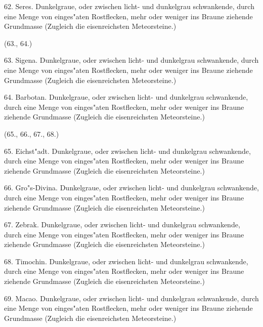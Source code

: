 \documentclass[a4paper, 11pt, oneside, polutonikogreek, german]{article}
\begin{document}
62. Seres. Dunkelgraue, oder zwischen licht- und dunkelgrau schwankende, durch eine Menge von einges"aten Rostflecken, mehr oder weniger ins Braune ziehende Grundmasse (Zugleich die eisenreichsten Meteorsteine.)

\begin{center}
(63., 64.)
\end{center}

63. Sigena. Dunkelgraue, oder zwischen licht- und dunkelgrau schwankende, durch eine Menge von einges"aten Rostflecken, mehr oder weniger ins Braune ziehende Grundmasse (Zugleich die eisenreichsten Meteorsteine.)

64. Barbotan. Dunkelgraue, oder zwischen licht- und dunkelgrau schwankende, durch eine Menge von einges"aten Rostflecken, mehr oder weniger ins Braune ziehende Grundmasse (Zugleich die eisenreichsten Meteorsteine.)

\begin{center}
(65., 66., 67., 68.)
\end{center}

65. Eichst"adt. Dunkelgraue, oder zwischen licht- und dunkelgrau schwankende, durch eine Menge von einges"aten Rostflecken, mehr oder weniger ins Braune ziehende Grundmasse (Zugleich die eisenreichsten Meteorsteine.)

66. Gro"s-Divina. Dunkelgraue, oder zwischen licht- und dunkelgrau schwankende, durch eine Menge von einges"aten Rostflecken, mehr oder weniger ins Braune ziehende Grundmasse (Zugleich die eisenreichsten Meteorsteine.)

67. Zebrak. Dunkelgraue, oder zwischen licht- und dunkelgrau schwankende, durch eine Menge von einges"aten Rostflecken, mehr oder weniger ins Braune ziehende Grundmasse (Zugleich die eisenreichsten Meteorsteine.)

68. Timochin. Dunkelgraue, oder zwischen licht- und dunkelgrau schwankende, durch eine Menge von einges"aten Rostflecken, mehr oder weniger ins Braune ziehende Grundmasse (Zugleich die eisenreichsten Meteorsteine.)

\vspace{2ex}

69. Macao. Dunkelgraue, oder zwischen licht- und dunkelgrau schwankende, durch eine Menge von einges"aten Rostflecken, mehr oder weniger ins Braune ziehende Grundmasse (Zugleich die eisenreichsten Meteorsteine.)
\subsection{}
\end{document}
